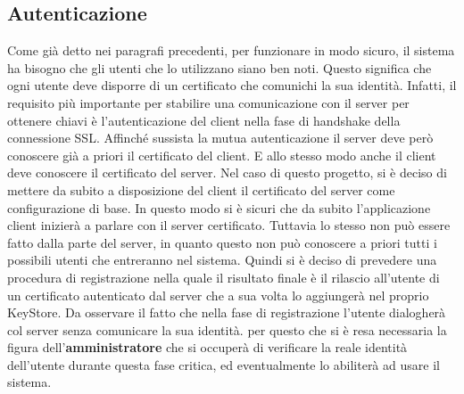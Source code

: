 \subsection{Autenticazione}
	\label{subsec:autenticazione}
Come già detto nei paragrafi precedenti, per funzionare in modo sicuro, il sistema ha bisogno che gli utenti che lo utilizzano siano ben noti. Questo significa che ogni utente deve disporre di un certificato che comunichi la sua identità. Infatti, il requisito più importante per stabilire una comunicazione con il server per ottenere chiavi è l'autenticazione del client nella fase di handshake della connessione SSL.
Affinché sussista la mutua autenticazione il server deve però conoscere già a priori il certificato del client. E allo stesso modo anche il client deve conoscere il certificato del server.
Nel caso di questo progetto, si è deciso di mettere da subito a disposizione del client il certificato del server come configurazione di base. In questo modo si è sicuri che da subito l'applicazione client inizierà a parlare con il server certificato.
Tuttavia lo stesso non può essere fatto dalla parte del server, in quanto questo non può conoscere a priori tutti i possibili utenti che entreranno nel sistema. Quindi si è deciso di prevedere una procedura di registrazione nella quale il risultato finale è il rilascio all'utente di un certificato autenticato dal server che a sua volta lo aggiungerà nel proprio KeyStore.
Da osservare il fatto che nella fase di registrazione l'utente dialogherà col server senza comunicare la sua identità.  per questo che si è resa necessaria la figura dell'\textbf{amministratore} che si occuperà di verificare la reale identità dell'utente durante questa fase critica, ed eventualmente lo abiliterà ad usare il sistema.
